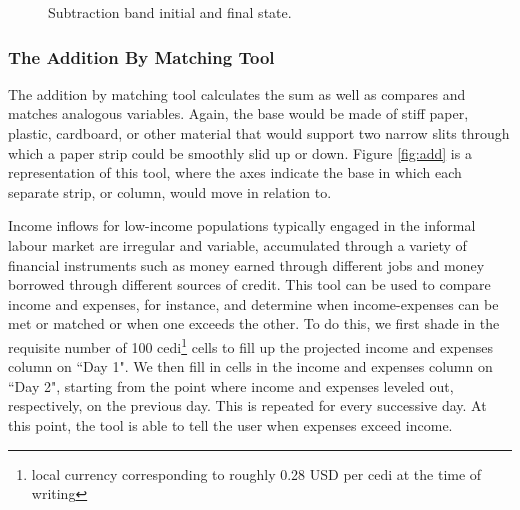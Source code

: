 \documentclass{sig-alternate}
\begin{document}
\begin{figure}%
    \centering
    \qquad
    \caption{Subtraction band initial and final state.}%
    \label{fig:band}%
\end{figure}

\subsubsection{The Addition By Matching Tool}

The addition by matching tool calculates the sum as well as compares and matches analogous variables. Again, the base would be made of stiff paper, plastic, cardboard, or other material that would support two narrow slits through which a paper strip could be smoothly slid up or down. Figure \ref{fig:add} is a representation of this tool, where the axes indicate the base in which each separate strip, or column, would move in relation to.

Income inflows for low-income populations typically engaged in the informal labour market are irregular and variable, accumulated through a variety of financial instruments such as money earned through different jobs and money borrowed through different sources of credit. This tool can be used to compare income and expenses, for instance, and determine when income-expenses can be met or matched or when one exceeds the other. To do this, we first shade in the requisite number of 100 cedi\footnote{local currency corresponding to roughly 0.28 USD per cedi at the time of writing} cells to fill up the projected income and expenses column on ``Day 1". We then fill in cells in the income and expenses column on ``Day 2", starting from the point where income and expenses leveled out, respectively, on the previous day. This is repeated for every successive day. At this point, the tool is able to tell the user when expenses exceed income. 
\end{document}
